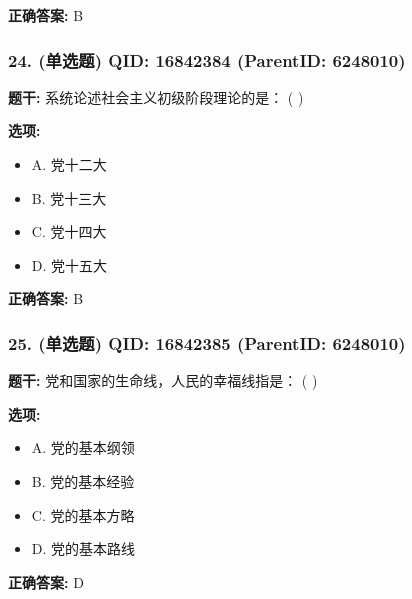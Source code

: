 \documentclass[12pt,UTF8]{ctexart}
\begin{document}
\textbf{正确答案:}
B

\vspace{0.3em}\hrulefill\vspace{0.7em}

\subsubsection*{24. (单选题) \small QID: 16842384 (ParentID: 6248010)}

\textbf{题干:}
系统论述社会主义初级阶段理论的是： ( )



\textbf{选项:}
\begin{itemize}[leftmargin=*]

  \item A. 党十二大

  \item B. 党十三大

  \item C. 党十四大

  \item D. 党十五大

\end{itemize}

\textbf{正确答案:}
B

\vspace{0.3em}\hrulefill\vspace{0.7em}

\subsubsection*{25. (单选题) \small QID: 16842385 (ParentID: 6248010)}

\textbf{题干:}
党和国家的生命线，人民的幸福线指是： ( )



\textbf{选项:}
\begin{itemize}[leftmargin=*]

  \item A. 党的基本纲领

  \item B. 党的基本经验

  \item C. 党的基本方略

  \item D. 党的基本路线

\end{itemize}

\textbf{正确答案:}
D

\vspace{0.3em}\hrulefill\vspace{0.7em}
\end{document}
